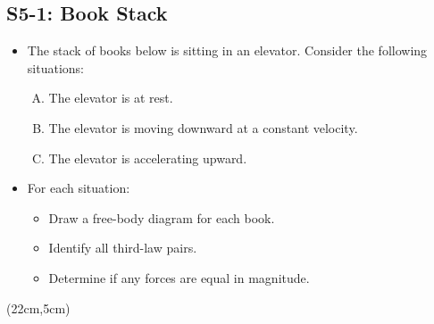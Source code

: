 \documentclass[]{article}
\begin{document}
\begin{PresentSpace}
\vspace{-10pt}
\section*{S5-1: Book Stack}
\vspace{-10pt}
\begin{itemize}
	\item The stack of books below is sitting in an elevator. Consider the following situations:
	\begin{enumerate}[(A)]
		\item The elevator is at rest.
		\item The elevator is moving downward at a constant velocity.
		\item The elevator is accelerating upward.
	\end{enumerate}
	\item For each situation:
	\begin{itemize}
		\item Draw a free-body diagram for each book.
		\item Identify all third-law pairs.
		\item Determine if any forces are equal in magnitude.
	\end{itemize}
\end{itemize}
\end{PresentSpace}
\begin{textblock*}{5cm}(22cm,5cm)
	\begin{center}
		\small
	\end{center}
\end{textblock*}
\newpage
\end{document}
